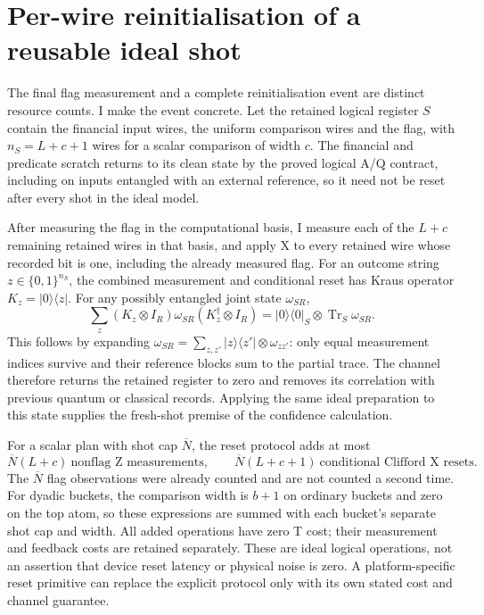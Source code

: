 
\section{Per-wire reinitialisation of a reusable ideal shot}
\label{sec:shot-reinitialisation}

The final flag measurement and a complete reinitialisation event are distinct resource counts. I make the event concrete. Let the retained logical register \(S\) contain the financial input wires, the uniform comparison wires and the flag, with \(n_S=L+c+1\) wires for a scalar comparison of width \(c\). The financial and predicate scratch returns to its clean state by the proved logical A/Q contract, including on inputs entangled with an external reference, so it need not be reset after every shot in the ideal model.

After measuring the flag in the computational basis, I measure each of the \(L+c\) remaining retained wires in that basis, and apply X to every retained wire whose recorded bit is one, including the already measured flag. For an outcome string \(z\in\{0,1\}^{n_S}\), the combined measurement and conditional reset has Kraus operator
\(K_z=|0\rangle\langle z|\). For any possibly entangled joint state \(\omega_{SR}\),
\[
 \sum_z(K_z\otimes I_R)\omega_{SR}(K_z^\dagger\otimes I_R)
 =|0\rangle\langle0|_S\otimes\operatorname{Tr}_S\omega_{SR}.
\]
This follows by expanding \(\omega_{SR}=\sum_{z,z'}|z\rangle\langle z'|\otimes\omega_{zz'}\): only equal measurement indices survive and their reference blocks sum to the partial trace. The channel therefore returns the retained register to zero and removes its correlation with previous quantum or classical records. Applying the same ideal preparation to this state supplies the fresh-shot premise of the confidence calculation.

For a scalar plan with shot cap \(\overline N\), the reset protocol adds at most
\[
 \overline N(L+c)\ \text{nonflag Z measurements},\qquad
 \overline N(L+c+1)\ \text{conditional Clifford X resets}.
\]
The \(\overline N\) flag observations were already counted and are not counted a second time. For dyadic buckets, the comparison width is \(b+1\) on ordinary buckets and zero on the top atom, so these expressions are summed with each bucket's separate shot cap and width. All added operations have zero T cost; their measurement and feedback costs are retained separately. These are ideal logical operations, not an assertion that device reset latency or physical noise is zero. A platform-specific reset primitive can replace the explicit protocol only with its own stated cost and channel guarantee.
